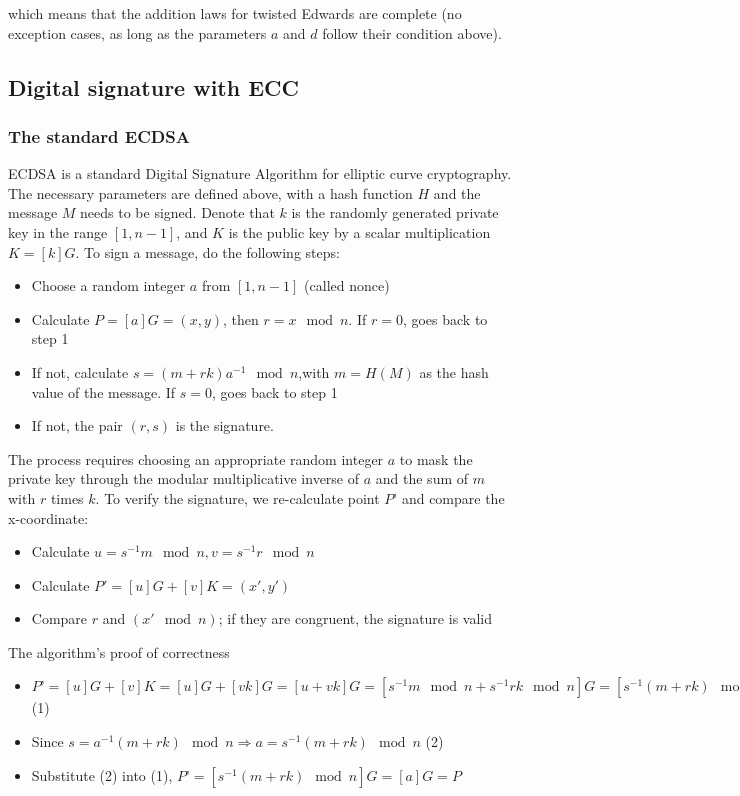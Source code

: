 which means that the addition laws for twisted Edwards are complete (no exception cases, as long as the parameters $a$ and $d$ follow their condition above).

\subsection{Digital signature with ECC}

\subsubsection{The standard ECDSA}
ECDSA is a standard Digital Signature Algorithm for elliptic curve cryptography. The necessary parameters are defined above, with a hash function $H$ and the message $M$ needs to be signed. Denote that $k$ is the randomly generated private key in the range  $[1, n - 1]$, and $K$ is the public key by a scalar multiplication $K =[k]G$. To sign a message, do the following steps:

\begin{itemize}
  \item Choose a random integer $a$ from $[1, n - 1]$ (called nonce)
  \item Calculate $P = [a]G = (x, y)$, then $r = x \mod n$. If $r = 0$, goes back to step 1
  \item If not, calculate $s=(m+rk) a^{-1} \mod n$,with $m = H(M)$ as the hash value of the message. If $s = 0$, goes back to step 1
  \item If not, the pair $(r, s)$ is the signature.
\end{itemize}

The process requires choosing an appropriate random integer $a$ to mask the private key through the modular multiplicative inverse of $a$ and the sum of $m$ with $r$ times $k$. To verify the signature, we re-calculate point $P’$ and compare the x-coordinate:

\begin{itemize}
  \item Calculate $u = s^{-1}m \mod n, v = s^{-1}r \mod n$
  \item Calculate $P' = [u]G + [v]K = (x', y')$
  \item Compare $r$ and $(x' \mod n)$; if they are congruent, the signature is valid
\end{itemize}

The algorithm’s proof of correctness

\begin{itemize}
  \item $P’ = [u]G + [v]K = [u]G + [vk]G = [u +vk]G = [s^{-1}m \mod n + s^{-1}rk \mod n]G = [s^{-1}(m + rk) \mod n]G$ (1)
  \item Since $s = a^{-1}(m+rk) \mod n \Rightarrow a = s^{-1}(m+rk) \mod n$ (2)
  \item Substitute (2) into (1), $P’ = [s^{-1}(m + rk) \mod n]G = [a]G = P$
\end{itemize}

